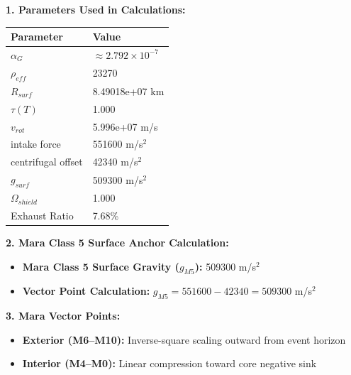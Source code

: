 \documentclass[11pt, a4paper]{article}
\begin{document}
\vspace{0.5em}
\noindent \textbf{1. Parameters Used in Calculations:}
\begin{center}
  \begin{tabular}{|l|l|}
    \hline
    \textbf{Parameter} & \textbf{Value} \\ \hline
    $\alpha_G$ & $\approx 2.792 \times 10^{-7}$ \\ \hline
    $\rho_{eff}$ & 23270 \\ \hline
    $R_{surf}$ & 8.49018e+07 km \\ \hline
    $\tau(T)$ & 1.000 \\ \hline
    $v_{rot}$ & 5.996e+07 m/s \\ \hline
    intake force & 551600 m/s$^2$ \\ \hline
    centrifugal offset & 42340 m/s$^2$ \\ \hline
    $g_{surf}$ & 509300 m/s$^2$ \\ \hline
    $\Omega_{shield}$ & 1.000 \\ \hline
    Exhaust Ratio & 7.68\% \\ \hline
  \end{tabular}
\end{center}

\vspace{0.5em}
\noindent \textbf{2. Mara Class 5 Surface Anchor Calculation:}
\begin{itemize}
  \item \textbf{Mara Class 5 Surface Gravity ($g_{M5}$):} 509300 m/s$^2$
  \item \textbf{Vector Point Calculation:} $g_{M5} = 551600 - 42340 = 509300$ m/s$^2$
\end{itemize}

\vspace{0.5em}
\noindent \textbf{3. Mara Vector Points:}
\begin{itemize}
  \item \textbf{Exterior (M6--M10):} Inverse-square scaling outward from event horizon
  \item \textbf{Interior (M4--M0):} Linear compression toward core negative sink
\end{itemize}
\end{document}
